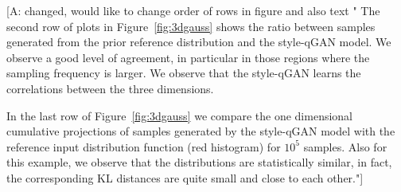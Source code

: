 \documentclass[twocolumn,preprintnumbers,superscriptaddress]{revtex4-2}
\newcommand{\commentAF}[1]{{\color{cyan} {[A: #1]}}}
\begin{document}
\commentAF{changed, would like to change order of rows in figure and also text "
The second row of plots in Figure~\ref{fig:3dgauss} shows the ratio between
samples generated from the prior reference distribution and the style-qGAN model. We
observe a good level of agreement, in particular in those regions where the
sampling frequency is larger. We observe that the style-qGAN learns the correlations
between the three dimensions.

In the last row of Figure~\ref{fig:3dgauss} we compare the one dimensional
cumulative projections of samples generated by the style-qGAN model with the
reference input distribution function (red histogram) for $10^5$ samples. Also
for this example, we observe that the distributions are statistically similar,
in fact, the corresponding KL distances are quite small and close to each other."}
\end{document}
